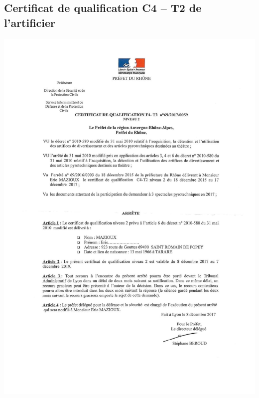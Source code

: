 \documentclass[hidelinks, paper=a4, fontsize=13pt]{report}
\begin{document}
\subsection{Certificat de qualification C4 – T2 de l’artificier}
\begin{center}
\includegraphics[scale=0.70]{Annexes/Documents/CertificatArtifice2}
\end{center}
\end{document}
